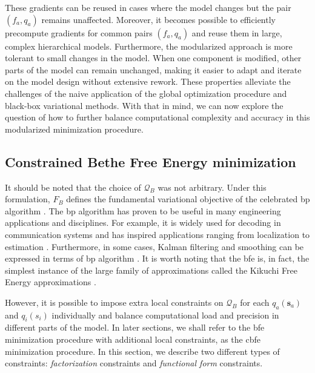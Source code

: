 These gradients can be reused in cases where the model changes but the pair $(f_a, q_a)$ remains unaffected.
Moreover, it becomes possible to efficiently precompute gradients for common pairs
$(f_a, q_a)$ and reuse them in large, complex hierarchical models.
Furthermore, the modularized approach is more tolerant to small changes in the model.
When one component is modified, other parts of the model can remain unchanged, making it
easier to adapt and iterate on the model design without extensive rework.
These properties alleviate the challenges of the naive application of the global optimization
procedure and black-box variational methods.
With that in mind, we can now explore the question of how to further balance computational complexity
and accuracy in this modularized minimization procedure.

\subsection{Constrained Bethe Free Energy minimization}\label{chapter-02:section:bethe-free-energy:subsection:cbfe}

It should be noted that the choice of $\mathcal{Q}_B$ was not arbitrary.
Under this formulation, $F_B$ defines the fundamental variational objective of the celebrated
\ac{bp} algorithm \citep{yedidia_constructing_2005, pearl_probabilistic_1988}.
The \ac{bp} algorithm has proven to be useful in many engineering applications and disciplines. 
For example, it is widely used for decoding in communication systems \citep{forney_codes_2001, kschischang_factor_2001, sibel_region-based_nodate} and has inspired applications ranging from localization \citep{loeliger_localizing_2009} to estimation \citep{korl_factor_2005}.
Furthermore, in some cases, Kalman filtering and smoothing can be expressed in terms of 
\ac{bp} algorithm \citep{minka_hidden_1999, loeliger_factor_2007}.
It is worth noting that the \ac{bfe} is, in fact, the simplest instance of the large family of approximations called the Kikuchi Free Energy approximations \citep{yedidia_bethe_2001}.

However, it is possible to impose extra local constraints on $\mathcal{Q}_B$ for each
$q_a(\bm{s}_a)$ and $q_i(s_i)$ individually and balance computational load and precision
in different parts of the model.
In later sections, we shall refer to the \ac{bfe} minimization procedure with additional local constraints, as the \acf{cbfe} minimization procedure.
In this section, we describe two different types of constraints: \textit{factorization}
constraints and \textit{functional form} constraints.

